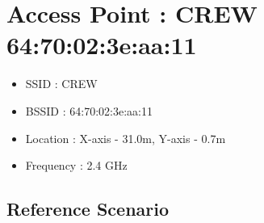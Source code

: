 \documentclass[11pt,a4paper,headinclude,footinclude,chapterprefix=on]{scrreprt}
\begin{document}
\begin{longtable}
\end{longtable}

\section{Access Point : CREW 64:70:02:3e:aa:11} 
\begin{itemize}
	\item SSID : CREW 
	\item BSSID : 64:70:02:3e:aa:11 
	\item Location : X-axis - 31.0m, Y-axis - 0.7m 
	\item Frequency : 2.4 GHz 
\end{itemize}
\subsection{Reference Scenario} 
\end{document}
